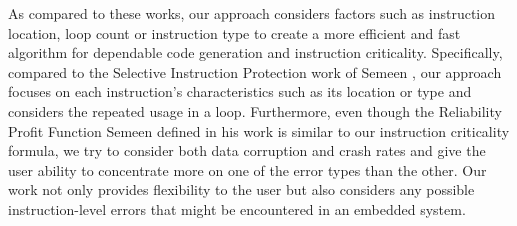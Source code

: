  As compared to these works, our approach considers factors such as instruction location, loop count or instruction type to create a more efficient and fast algorithm for dependable code generation and instruction criticality. Specifically, compared to the Selective Instruction Protection work of Semeen \cite{Rehman:2016}, our approach focuses on each instruction's characteristics such as its location or type and considers the repeated usage in a loop. Furthermore, even though the Reliability Profit Function Semeen defined in his work is similar to our instruction criticality formula, we try to consider both data corruption and crash rates and give the user ability to concentrate more on one of the error types than the other. Our work not only provides flexibility to the user but also considers any possible instruction-level errors that might be encountered in an embedded system. 
  

